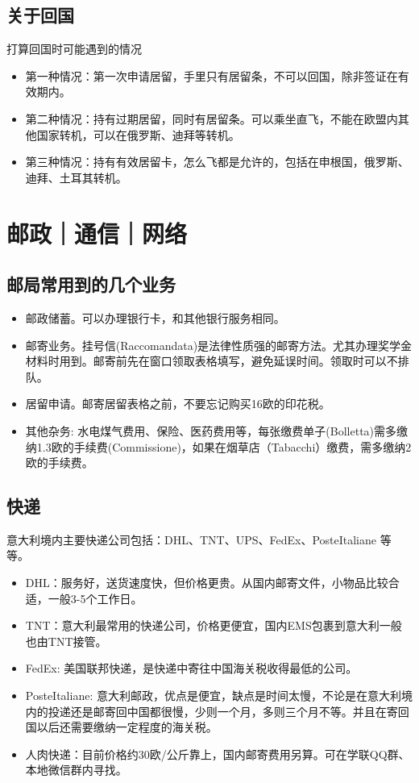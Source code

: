 \subsection{关于回国}
打算回国时可能遇到的情况
\begin{itemize}
\item 第一种情况：第一次申请居留，手里只有居留条，不可以回国，除非签证在有效期内。
\item 第二种情况：持有过期居留，同时有居留条。可以乘坐直飞，不能在欧盟内其他国家转机，可以在俄罗斯、迪拜等转机。
\item 第三种情况：持有有效居留卡，怎么飞都是允许的，包括在申根国，俄罗斯、迪拜、土耳其转机。
\end{itemize}

\section{邮政｜通信｜网络}

\subsection{邮局常用到的几个业务}
\begin{itemize}
\item 邮政储蓄。可以办理银行卡，和其他银行服务相同。
\item 邮寄业务。挂号信(Raccomandata)是法律性质强的邮寄方法。尤其办理奖学金材料时用到。邮寄前先在窗口领取表格填写，避免延误时间。领取时可以不排队。
\item 居留申请。邮寄居留表格之前，不要忘记购买16欧的印花税。
\item 其他杂务: 水电煤气费用、保险、医药费用等，每张缴费单子(Bolletta)需多缴纳1.3欧的手续费(Commissione)，如果在烟草店（Tabacchi）缴费，需多缴纳2欧的手续费。

\end{itemize}

\subsection{快递}
意大利境内主要快递公司包括：DHL、TNT、UPS、FedEx、PosteItaliane 等等。
\begin{itemize}
\item DHL：服务好，送货速度快，但价格更贵。从国内邮寄文件，小物品比较合适，一般3-5个工作日。
\item TNT：意大利最常用的快递公司，价格更便宜，国内EMS包裹到意大利一般也由TNT接管。
\item FedEx: 美国联邦快递，是快递中寄往中国海关税收得最低的公司。
\item PosteItaliane: 意大利邮政，优点是便宜，缺点是时间太慢，不论是在意大利境内的投递还是邮寄回中国都很慢，少则一个月，多则三个月不等。并且在寄回国以后还需要缴纳一定程度的海关税。
\item 人肉快递：目前价格约30欧/公斤靠上，国内邮寄费用另算。可在学联QQ群、本地微信群内寻找。
\end{itemize}

